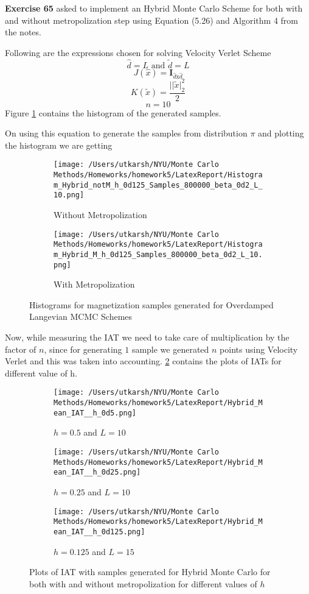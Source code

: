 \documentclass[11pt]{article}
\begin{document}
\noindent \textbf{Exercise 65} asked to implement an Hybrid Monte Carlo Scheme for both with and without metropolization step using Equation (5.26) and Algorithm 4
from the notes.

Following are the expressions chosen for solving Velocity Verlet Scheme
$$\hat{d} = L \text{   and     } \tilde{d} = L$$
$$J(\hat{x}) = \textbf{I}_{\hat{d} \text{x} \hat{d}}$$
$$K(\tilde{x}) = \frac{||\tilde{x}|^2_2}{2}$$
$$n = 10$$
Figure \ref{fig:histograms_q65} contains the histogram of the generated samples.

On using this equation to generate the samples from distribution $\pi$ and plotting the histogram we are getting
\begin{figure}[H]
	\centering
	\begin{subfigure}{.40\textwidth}
		\texttt{[image: /Users/utkarsh/NYU/Monte Carlo Methods/Homeworks/homework5/LatexReport/Histogram\_Hybrid\_notM\_h\_0d125\_Samples\_800000\_beta\_0d2\_L\_10.png]}
		\caption{Without Metropolization}
	\end{subfigure}
	\begin{subfigure}{.40\textwidth}
		\texttt{[image: /Users/utkarsh/NYU/Monte Carlo Methods/Homeworks/homework5/LatexReport/Histogram\_Hybrid\_M\_h\_0d125\_Samples\_800000\_beta\_0d2\_L\_10.png]}
		\caption{With Metropolization}
	\end{subfigure}
	\caption{Histograms for magnetization samples generated for Overdamped Langevian MCMC Schemes}
	\label{fig:histograms_q65}
\end{figure}

Now, while measuring the IAT we need to take care of multiplication by the factor of $n$, since for generating $1$ sample we generated $n$ points using Velocity Verlet and this was taken into accounting.
\ref{fig:iat_plots_q65} contains the plots of IATs for different value of h.

\begin{figure}[H]
	\centering
	\begin{subfigure}{.30\textwidth}
		\texttt{[image: /Users/utkarsh/NYU/Monte Carlo Methods/Homeworks/homework5/LatexReport/Hybrid\_Mean\_IAT\_\_h\_0d5.png]}
		\caption{$h = 0.5$ and $L = 10$}
	\end{subfigure}
	\begin{subfigure}{.30\textwidth}
		\texttt{[image: /Users/utkarsh/NYU/Monte Carlo Methods/Homeworks/homework5/LatexReport/Hybrid\_Mean\_IAT\_\_h\_0d25.png]}
		\caption{$h = 0.25$ and $L = 10$}
	\end{subfigure}
	\begin{subfigure}{.30\textwidth}
		\texttt{[image: /Users/utkarsh/NYU/Monte Carlo Methods/Homeworks/homework5/LatexReport/Hybrid\_Mean\_IAT\_\_h\_0d125.png]}
		\caption{$h = 0.125$ and $L = 15$}
	\end{subfigure}
	\caption{Plots of IAT with samples generated for Hybrid Monte Carlo for both with and without metropolization for different values of $h$}
	\label{fig:iat_plots_q65}
\end{figure}
\end{document}
